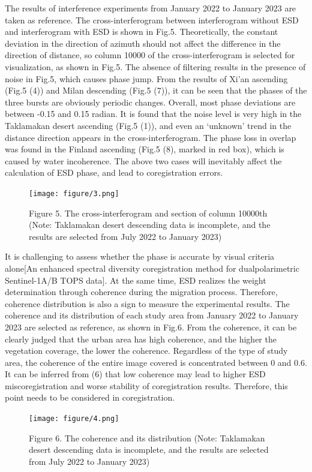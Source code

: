 \documentclass[a4paper,fleqn]{cas-dc}
\begin{document}
The results of interference experiments from January 2022 to January 2023 are taken as reference. The cross-interferogram between interferogram without ESD and interferogram with ESD is shown in Fig.5. Theoretically, the constant deviation in the direction of azimuth should not affect the difference in the direction of distance, so column 10000 of the cross-interferogram is selected for visualization, as shown in Fig.5. The absence of filtering results in the presence of noise in Fig.5, which causes phase jump. From the results of Xi’an ascending (Fig.5 (4)) and Milan descending (Fig.5 (7)), it can be seen that the phases of the three bursts are obviously periodic changes. Overall, most phase deviations are between -0.15 and 0.15 radian. It is found that the noise level is very high in the Taklamakan desert ascending (Fig.5 (1)), and even an ‘unknown’ trend in the distance direction appears in the cross-interferogram. The phase loss in overlap was found in the Finland ascending (Fig.5 (8), marked in red box), which is caused by water incoherence. The above two cases will inevitably affect the calculation of ESD phase, and lead to coregistration errors. \par
\begin{figure}
	\centering 
	\texttt{[image: figure/3.png]}	
	\caption{Figure 5. The cross-interferogram and section of column 10000th (Note: Taklamakan desert descending data is incomplete, and the results are selected from July 2022 to January 2023)} 
	\label{fig_6}
\end{figure}
It is challenging to assess whether the phase is accurate by visual criteria alone[An enhanced spectral diversity coregistration method for dualpolarimetric Sentinel-1A/B TOPS data]. At the same time, ESD realizes the weight determination through coherence during the migration process. Therefore, coherence distribution is also a sign to measure the experimental results. The coherence and its distribution of each study area from January 2022 to January 2023 are selected as reference, as shown in Fig.6. From the coherence, it can be clearly judged that the urban area has high coherence, and the higher the vegetation coverage, the lower the coherence. Regardless of the type of study area, the coherence of the entire image covered is concentrated between 0 and 0.6. It can be inferred from (6) that low coherence may lead to higher ESD miscoregistration and worse stability of coregistration results. Therefore, this point needs to be considered in coregistration. \par
\begin{figure}
	\centering 
	\texttt{[image: figure/4.png]}	
	\caption{Figure 6. The coherence and its distribution (Note: Taklamakan desert descending data is incomplete, and the results are selected from July 2022 to January 2023)} 
	\label{fig_7}
\end{figure}
\end{document}
